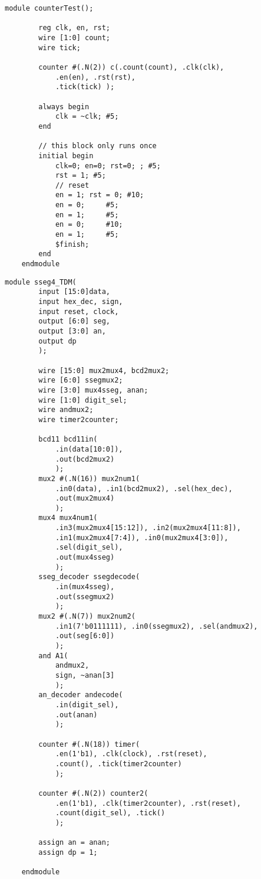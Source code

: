 \documentclass[11pt]{article}
\begin{document}
\begin{lstlisting}[style=Verilog,
caption=Counter Test,
label=MUX2 Test
]
	module counterTest();
	
		reg clk, en, rst;
		wire [1:0] count;
		wire tick;
		
		counter #(.N(2)) c(.count(count), .clk(clk),
			.en(en), .rst(rst),
			.tick(tick) );
	
		always begin 
			clk = ~clk; #5; 
		end
		
		// this block only runs once
		initial begin
			clk=0; en=0; rst=0; ; #5;
			rst = 1; #5;
			// reset
			en = 1; rst = 0; #10;
			en = 0;     #5;
			en = 1;     #5;
			en = 0;     #10;
			en = 1;     #5;
			$finish;
		end 
	endmodule
\end{lstlisting}

\begin{lstlisting}[style=Verilog,
caption= Sseg4TDM Source Code,
label=MUX w/ four inputs Source Code
]
	module sseg4_TDM(
		input [15:0]data,
		input hex_dec, sign,
		input reset, clock,
		output [6:0] seg,
		output [3:0] an,
		output dp
		);
		
		wire [15:0] mux2mux4, bcd2mux2;
		wire [6:0] ssegmux2;
		wire [3:0] mux4sseg, anan;
		wire [1:0] digit_sel;
		wire andmux2;
		wire timer2counter;
		
		bcd11 bcd11in(
			.in(data[10:0]),
			.out(bcd2mux2)
			);
		mux2 #(.N(16)) mux2num1(
			.in0(data), .in1(bcd2mux2), .sel(hex_dec),
			.out(mux2mux4)
			);
		mux4 mux4num1(
			.in3(mux2mux4[15:12]), .in2(mux2mux4[11:8]), 
			.in1(mux2mux4[7:4]), .in0(mux2mux4[3:0]),
			.sel(digit_sel),
			.out(mux4sseg)
			);
		sseg_decoder ssegdecode(
			.in(mux4sseg),
			.out(ssegmux2)
			);
		mux2 #(.N(7)) mux2num2(
			.in1(7'b0111111), .in0(ssegmux2), .sel(andmux2),
			.out(seg[6:0])
			);
		and A1(
			andmux2,
			sign, ~anan[3]
			);
		an_decoder andecode(
			.in(digit_sel),
			.out(anan)
			);
		
		counter #(.N(18)) timer(
			.en(1'b1), .clk(clock), .rst(reset),
			.count(), .tick(timer2counter)
			);
		
		counter #(.N(2)) counter2(
			.en(1'b1), .clk(timer2counter), .rst(reset),
			.count(digit_sel), .tick()
			);
		
		assign an = anan;
		assign dp = 1;
	
	endmodule
\end{lstlisting}
\clearpage
\end{document}
